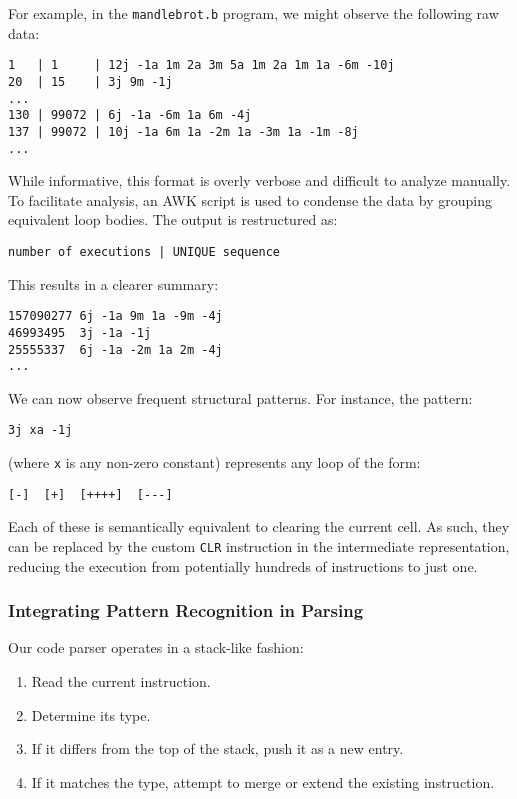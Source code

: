 For example, in the \texttt{mandlebrot.b} program, we might observe the following raw data:

\begin{verbatim}
1   | 1     | 12j -1a 1m 2a 3m 5a 1m 2a 1m 1a -6m -10j
20  | 15    | 3j 9m -1j
...
130 | 99072 | 6j -1a -6m 1a 6m -4j
137 | 99072 | 10j -1a 6m 1a -2m 1a -3m 1a -1m -8j
...
\end{verbatim}

While informative, this format is overly verbose and difficult to analyze manually. To facilitate analysis, an AWK script is used to condense the data by grouping equivalent loop bodies. The output is restructured as:

\begin{verbatim}
number of executions | UNIQUE sequence
\end{verbatim}

This results in a clearer summary:

\begin{verbatim}
157090277 6j -1a 9m 1a -9m -4j
46993495  3j -1a -1j
25555337  6j -1a -2m 1a 2m -4j
...
\end{verbatim}

We can now observe frequent structural patterns. For instance, the pattern:

\begin{verbatim}
3j xa -1j
\end{verbatim}

(where \texttt{x} is any non-zero constant) represents any loop of the form:

\begin{verbatim}
[-]  [+]  [++++]  [---]
\end{verbatim}

Each of these is semantically equivalent to clearing the current cell. As such, they can be replaced by the custom \texttt{CLR} instruction in the intermediate representation, reducing the execution from potentially hundreds of instructions to just one.

\subsubsection*{Integrating Pattern Recognition in Parsing}

Our code parser operates in a stack-like fashion:

\begin{enumerate}
    \item Read the current instruction.
    \item Determine its type.
    \item If it differs from the top of the stack, push it as a new entry.
    \item If it matches the type, attempt to merge or extend the existing instruction.
\end{enumerate}

